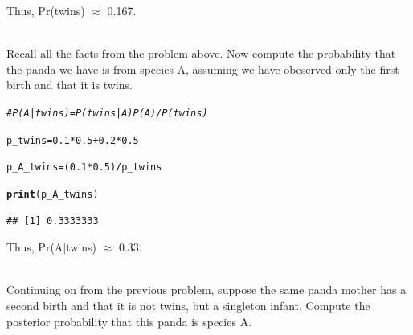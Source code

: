 \documentclass[12pt]{article}\usepackage[]{graphicx}\usepackage[]{color}
\makeatletter
\newcommand{\hlnum}[1]{\textcolor[rgb]{0.686,0.059,0.569}{#1}}%
\newcommand{\hlcom}[1]{\textcolor[rgb]{0.678,0.584,0.686}{\textit{#1}}}%
\newcommand{\hlopt}[1]{\textcolor[rgb]{0,0,0}{#1}}%
\newcommand{\hlstd}[1]{\textcolor[rgb]{0.345,0.345,0.345}{#1}}%
\newcommand{\hlkwb}[1]{\textcolor[rgb]{0.69,0.353,0.396}{#1}}%
\newcommand{\hlkwd}[1]{\textcolor[rgb]{0.737,0.353,0.396}{\textbf{#1}}}%
\newenvironment{kframe}{%
 \def\at@end@of@kframe{}%
 \ifinner\ifhmode%
  \def\at@end@of@kframe{\end{minipage}}%
  \begin{minipage}{\columnwidth}%
 \fi\fi%
 \def\FrameCommand##1{\hskip\@totalleftmargin \hskip-\fboxsep
 \colorbox{shadecolor}{##1}\hskip-\fboxsep
     \hskip-\linewidth \hskip-\@totalleftmargin \hskip\columnwidth}%
 \MakeFramed {\advance\hsize-\width
   \@totalleftmargin\z@ \linewidth\hsize
   \@setminipage}}%
 {\par\unskip\endMakeFramed%
 \at@end@of@kframe}
\newenvironment{knitrout}{}{} %
\newenvironment{problem}[2][Problem]{\begin{trivlist}
\item[\hskip \labelsep {\bfseries #1}\hskip \labelsep {\bfseries #2.}]}{\end{trivlist}}
\makeatother
\begin{document}
Thus, Pr(twins) $\approx$ 0.167.

\begin{problem}{2H2}
\text{}\\
Recall all the facts from the problem above. Now compute the probability that the panda we have is from species A, assuming we have obeserved only the first birth and that it is twins.
\end{problem}

\begin{knitrout}
\color{fgcolor}\begin{kframe}
\begin{alltt}
\hlcom{# P(A|twins) = P(twins|A)P(A)/P(twins)}

\hlstd{p_twins} \hlkwb{=} \hlnum{0.1} \hlopt{*} \hlnum{0.5} \hlopt{+} \hlnum{0.2} \hlopt{*} \hlnum{0.5}

\hlstd{p_A_twins} \hlkwb{=} \hlstd{(}\hlnum{0.1} \hlopt{*} \hlnum{0.5}\hlstd{)}\hlopt{/}\hlstd{p_twins}

\hlkwd{print}\hlstd{(p_A_twins)}
\end{alltt}
\begin{verbatim}
## [1] 0.3333333
\end{verbatim}
\end{kframe}
\end{knitrout}

Thus, Pr(A$\vert$twins) $\approx$ 0.33.

\begin{problem}{2H3}
\text{}\\
Continuing on from the previous problem, suppose the same panda mother has a second birth and that it is not twins, but a singleton infant. Compute the posterior probability that this panda is species A.
\end{problem}
\end{document}
